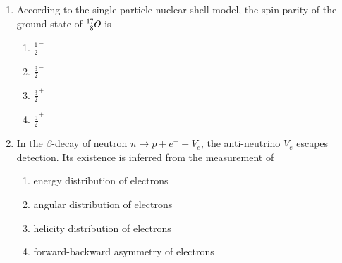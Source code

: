 \documentclass[journal]{IEEEtran}
\begin{document}
\begin{enumerate}
\begin{multicols}{4}
\begin{enumerate}
    \end{enumerate}
\end{multicols}
\item According to the single particle nuclear shell model, the spin-parity of the ground state of $\prescript{17}{8}{O}$ is
\begin{multicols}{4}
    \begin{enumerate}
        \item $\frac{1}{2}^-$
        \item $\frac{3}{2}^-$
        \item $\frac{3}{2}^+$
        \item $\frac{5}{2}^+$
    \end{enumerate}
\end{multicols}
\item In the $\beta$-decay of neutron $n\rightarrow p+e^-+V_e$, the anti-neutrino $V_e$ escapes detection. Its existence is inferred from the measurement of
\begin{enumerate}
    \item energy distribution of electrons
    \item angular distribution of electrons
    \item helicity distribution of electrons 
    \item forward-backward asymmetry of electrons
\end{enumerate}
\end{enumerate}
\end{document}
